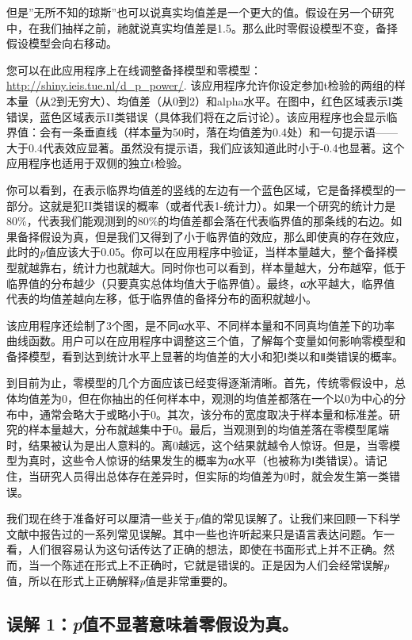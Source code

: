 \documentclass[
  letterpaper,
  DIV=11,
  numbers=noendperiod]{scrreprt}
\begin{document}
但是''无所不知的琼斯''也可以说真实均值差是一个更大的值。假设在另一个研究中，在我们抽样之前，祂就说真实均值差是1.5。那么此时零假设模型不变，备择假设模型会向右移动。

您可以在此应用程序上在线调整备择模型和零模型：\url{http://shiny.ieis.tue.nl/d_p_power/}.
该应用程序允许你设定参加t检验的两组的样本量（从2到无穷大）、均值差（从0到2）和alpha水平。在图中，红色区域表示I类错误，蓝色区域表示II类错误（具体我们将在之后讨论）。该应用程序也会显示临界值：会有一条垂直线（样本量为50时，落在均值差为0.4处）和一句提示语------大于0.4代表效应显著。虽然没有提示语，我们应该知道此时小于-0.4也显著。这个应用程序也适用于双侧的独立t检验。

你可以看到，在表示临界均值差的竖线的左边有一个蓝色区域，它是备择模型的一部分。这就是犯II类错误的概率（或者代表1-统计力）。如果一个研究的统计力是80\%，代表我们能观测到的80\%的均值差都会落在代表临界值的那条线的右边。如果备择假设为真，但是我们又得到了小于临界值的效应，那么即使真的存在效应，此时的\emph{p}值应该大于0.05。你可以在应用程序中验证，当样本量越大，整个备择模型就越靠右，统计力也就越大。同时你也可以看到，样本量越大，分布越窄，低于临界值的分布越少（只要真实总体均值大于临界值）。最终，α水平越大，临界值代表的均值差越向左移，低于临界值的备择分布的面积就越小。

该应用程序还绘制了3个图，是不同α水平、不同样本量和不同真均值差下的功率曲线函数。用户可以在应用程序中调整这三个值，了解每个变量如何影响零模型和备择模型，看到达到统计水平上显著的均值差的大小和犯Ⅰ类以和Ⅱ类错误的概率。

到目前为止，零模型的几个方面应该已经变得逐渐清晰。首先，传统零假设中，总体均值差为0，但在你抽出的任何样本中，观测的均值差都落在一个以0为中心的分布中，通常会略大于或略小于0。其次，该分布的宽度取决于样本量和标准差。研究的样本量越大，分布就越集中于0。最后，当观测到的均值差落在零模型尾端时，结果被认为是出人意料的。离0越远，这个结果就越令人惊讶。但是，当零模型为真时，这些令人惊讶的结果发生的概率为α水平（也被称为Ⅰ类错误）。请记住，当研究人员得出总体存在差异时，但实际的均值差为0时，就会发生第一类错误。

我们现在终于准备好可以厘清一些关于\emph{p}值的常见误解了。让我们来回顾一下科学文献中报告过的一系列常见误解。其中一些也许听起来只是语言表达问题。乍一看，人们很容易认为这句话传达了正确的想法，即使在书面形式上并不正确。然而，当一个陈述在形式上不正确时，它就是错误的。正是因为人们会经常误解\emph{p}值，所以在形式上正确解释\emph{p}值是非常重要的。

\hypertarget{sec-misconception1}{%
\subsection{\texorpdfstring{误解
1：\emph{p}值不显著意味着零假设为真。}{误解 1：p值不显著意味着零假设为真。}}\label{sec-misconception1}}
\end{document}

